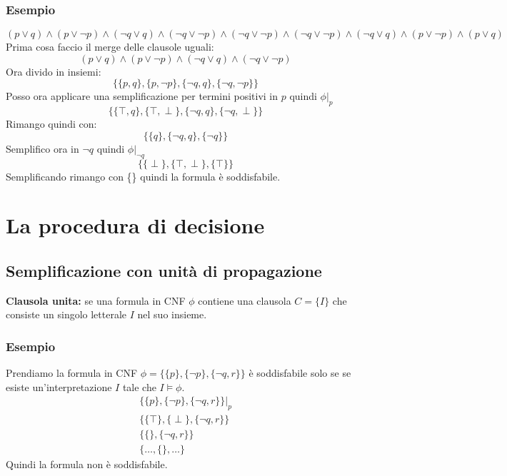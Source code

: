 \documentclass[../main.tex]{subfiles}
\begin{document}
    \subsubsection{Esempio}
    \begin{equation*}
        (p \lor q) \land (p \lor \lnot p) \land (\lnot q \lor q) \land (\lnot q \lor \lnot p) \land (\lnot q \lor \lnot p) \land (\lnot q \lor \lnot p) \land ( \lnot q \lor q )\land (p \lor \lnot p) \land (p \lor q)
    \end{equation*}
    Prima cosa faccio il merge delle clausole uguali:
    \begin{equation*}
        (p \lor q) \land (p \lor \lnot p) \land (\lnot q \lor q) \land (\lnot q \lor \lnot p) 
    \end{equation*}
    Ora divido in insiemi:
    \begin{equation*}
        \{ \{p,q\}, \{p,\lnot p\}, \{\lnot q,q\}, \{\lnot q,\lnot p\} \}
    \end{equation*}
    Posso ora applicare una semplificazione per termini positivi in $p$ quindi $\phi|_p$
    \begin{equation*}
        \{ \{\top,q\}, \{ \top , \perp \}, \{\lnot q,q\}, \{\lnot q,\perp \} \}
    \end{equation*}
    Rimango quindi con:
    \begin{equation*}
        \{ \{q\}, \{\lnot q,q\}, \{\lnot q \} \}
    \end{equation*}
    Semplifico ora in $\lnot q$ quindi $\phi|_{\lnot q}$
    \begin{equation*}
        \{ \{ \perp \}, \{\top , \perp \}, \{\top \} \}
    \end{equation*}
    Semplificando rimango con \{\} quindi la formula è soddisfabile.

    \section{La procedura di decisione}
    \subsection{Semplificazione con unità di propagazione}
    \textbf{Clausola unita:} se una formula in CNF $\phi$ contiene una clausola $C=\{I\}$ che consiste un singolo letterale $I$ nel suo insieme.
    \subsubsection{Esempio}
    Prendiamo la formula in CNF $\phi=\{\{p\}, \{\lnot p\}, \{\lnot q, r \}\}$ è soddisfabile solo se se esiste un'interpretazione $I$ tale che $I \models \phi$.
    \begin{gather*}
        \{\{p\}, \{\lnot p\}, \{\lnot q, r \}\}|_p\\
        \{\{ \top \}, \{ \perp \}, \{\lnot q, r \}\}\\
        \{\{\}, \{\lnot q, r \} \}\\
        \{ \dots,\{\}, \dots\}
    \end{gather*}
    Quindi la formula non è soddisfabile.
    
\end{document}
